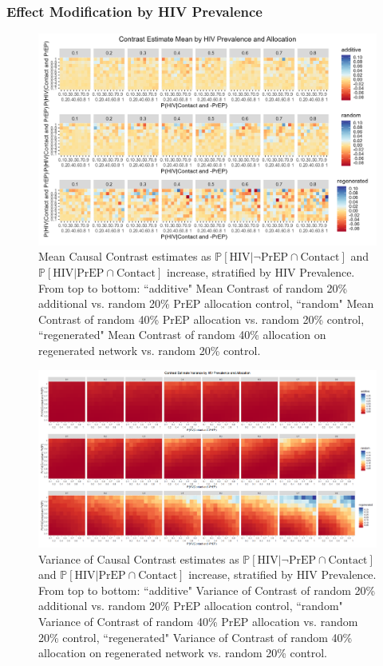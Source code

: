 \documentclass{article}
\theoremstyle{definition}
\begin{document}
\subsubsection{Effect Modification by HIV Prevalence}
\begin{figure}[H]
    \centering
    \includegraphics[width=\linewidth]{Figures/HIV Prevalence Mean plots.png}
    \caption{Mean Causal Contrast estimates as $\mathbb{P}\left[\text{HIV} \vert \neg \text{PrEP} \cap \text{Contact}\right]$ and $\mathbb{P}\left[\text{HIV} \vert \text{PrEP} \cap \text{Contact}\right]$ increase,  stratified by HIV Prevalence. From top to bottom: ``additive" Mean Contrast of random 20\% additional vs. random 20\% PrEP allocation control, ``random" Mean Contrast of random 40\% PrEP allocation vs. random 20\% control, ``regenerated" Mean Contrast of random 40\% allocation on regenerated network vs. random 20\% control.}
    \label{fig:Figure S4.5}
\end{figure}
\begin{figure}[H]
    \centering
    \includegraphics[width=\linewidth]{Figures/HIV Prevalence Variance plots.png}
    \caption{Variance of Causal Contrast estimates as $\mathbb{P}\left[\text{HIV} \vert \neg \text{PrEP} \cap \text{Contact}\right]$ and $\mathbb{P}\left[\text{HIV} \vert \text{PrEP} \cap \text{Contact}\right]$ increase,  stratified by HIV Prevalence. From top to bottom: ``additive" Variance of Contrast of random 20\% additional vs. random 20\% PrEP allocation control, ``random" Variance of Contrast of random 40\% PrEP allocation vs. random 20\% control, ``regenerated" Variance of Contrast of random 40\% allocation on regenerated network vs. random 20\% control.}
    \label{fig:Figure S4.6}
\end{figure}
\end{document}

